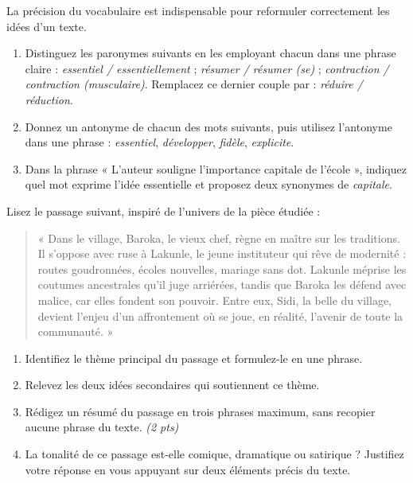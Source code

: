 \documentclass[11pt]{article}
\begin{document}
\begin{exercice}
La précision du vocabulaire est indispensable pour reformuler correctement les idées d'un texte.
\begin{enumerate}
\item Distinguez les paronymes suivants en les employant chacun dans une phrase claire : \textit{essentiel / essentiellement} ; \textit{résumer / résumer (se)} ; \textit{contraction / contraction (musculaire)}. Remplacez ce dernier couple par : \textit{réduire / réduction}.
\item Donnez un antonyme de chacun des mots suivants, puis utilisez l'antonyme dans une phrase : \textit{essentiel}, \textit{développer}, \textit{fidèle}, \textit{explicite}.
\item Dans la phrase « L'auteur souligne l'importance capitale de l'école », indiquez quel mot exprime l'idée essentielle et proposez deux synonymes de \textit{capitale}.
\end{enumerate}
\end{exercice}

\begin{exercice}
Lisez le passage suivant, inspiré de l'univers de la pièce étudiée :
\begin{quote}
« Dans le village, Baroka, le vieux chef, règne en maître sur les traditions. Il s'oppose avec ruse à Lakunle, le jeune instituteur qui rêve de modernité : routes goudronnées, écoles nouvelles, mariage sans dot. Lakunle méprise les coutumes ancestrales qu'il juge arriérées, tandis que Baroka les défend avec malice, car elles fondent son pouvoir. Entre eux, Sidi, la belle du village, devient l'enjeu d'un affrontement où se joue, en réalité, l'avenir de toute la communauté. »
\end{quote}
\begin{enumerate}
\item Identifiez le thème principal du passage et formulez-le en une phrase.
\item Relevez les deux idées secondaires qui soutiennent ce thème.
\item Rédigez un résumé du passage en trois phrases maximum, sans recopier aucune phrase du texte. \textit{(2 pts)}
\item La tonalité de ce passage est-elle comique, dramatique ou satirique ? Justifiez votre réponse en vous appuyant sur deux éléments précis du texte.
\end{enumerate}
\end{exercice}
\end{document}
